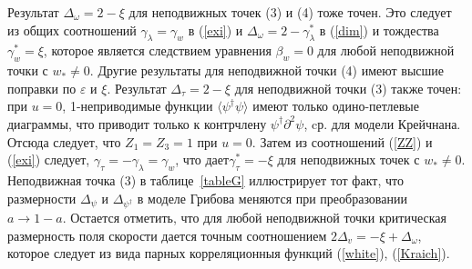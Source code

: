 \documentclass[a4paper,10pt]{article}
\begin{document}
Результат $\Delta_{\omega}=2-\xi$  для неподвижных точек (3) и (4) тоже точен. Это следует из общих соотношений  $\gamma_{\lambda}=\gamma_{w}$ 
 в (\ref{exi}) и $\Delta_{\omega}=2-\gamma_{\lambda}^{*}$ в (\ref{dim}) и тождества $\gamma_{w}^{*}= \xi$, которое 
является следствием уравнения $\beta_{w}=0$ для любой неподвижной точки с $w_{*}\ne 0$.
Другие результаты для неподвижной точки (4) имеют высшие поправки по   $\varepsilon$ и $\xi$.
Результат $\Delta_{\tau}=2-\xi$ для неподвижной точки (3) также точен: при  $u=0$, 1-неприводимые функции $\langle \psi^{\dag} \psi \rangle$
имеют только одино-петлевые диаграммы, что приводит только к контрчлену $\psi^{\dag}\partial^{2} \psi$, cр.  \cite{JphysA} для модели Крейчнана.
Отсюда следует, что $Z_{1}=Z_{3}=1$ при $u=0$. Затем из соотношений (\ref{ZZ}) и (\ref{exi}) следует,  $\gamma_{\tau}=-\gamma_{\lambda}=\gamma_{w}$,
что дает$\gamma_{\tau}^{*}= -\xi$ для неподвижных точек с $w_{*}\ne 0$.
Неподвижная точка (3) в таблице~\ref{tableG} иллюстрирует тот факт, что размерности $\Delta_{\psi}$ и $\Delta_{\psi^{\dag}}$ в моделе Грибова меняются 
при преобразовании $a\to1-a$.
Остается отметить, что для любой неподвижной точки критическая размерность поля скорости дается точным соотношением  $2\Delta_{v}=-\xi+\Delta_{\omega}$,
которое следует из вида парных корреляционныя функций (\ref{white}), (\ref{Kraich}).
\end{document}
